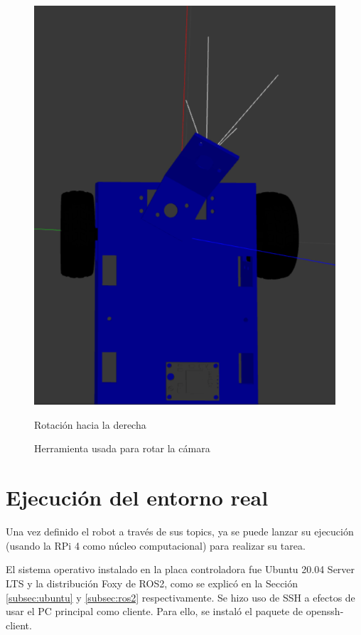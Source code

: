 \begin{figure}[ht!]
\begin{minipage}{0.35\linewidth}
		\includegraphics[width=\linewidth]{figs/cap6/rotder.png}
		\caption*{\centering Rotación hacia la derecha} 
	\end{minipage}
	\caption{Herramienta usada para rotar la cámara}
	\label{fig:camararot}
\end{figure}



\section{Ejecución del entorno real}
\label{sec:configrf}

Una vez definido el robot a través de sus topics, ya se puede lanzar su ejecución (usando la RPi 4 como núcleo computacional) para realizar su tarea.

El sistema operativo instalado en la placa controladora fue Ubuntu 20.04 Server \acs{LTS} y la distribución Foxy de ROS2, como se explicó en la Sección \ref{subsec:ubuntu} y \ref{subsec:ros2} respectivamente. Se hizo uso de SSH a efectos de usar el PC principal como cliente. Para ello, se instaló el paquete de openssh-client.

